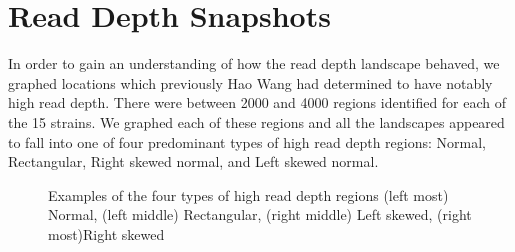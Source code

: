 \documentclass[12pt]{article}
\begin{document}
\section{Read Depth Snapshots}
\vspace{-0.5cm}
	In order to gain an understanding of how the read depth landscape behaved, we graphed locations which previously Hao Wang had determined to have notably high read depth. There were between 2000 and 4000 regions identified for each of the 15 strains. We graphed each of these regions and all the landscapes appeared to fall into one of four predominant types of high read depth regions: Normal, Rectangular, Right skewed normal, and Left skewed normal.
\begin{figure}[H]
	\begin{centering}
		\begin{singlespace}
			\vspace{-0.5cm}
			\caption[Examples of the four types of high read depth regions.]{Examples of the four types of high read depth regions (left most) Normal, (left middle) Rectangular, (right middle) Left skewed, (right most)Right skewed}\label{four_rds}
		\end{singlespace}
	\end{centering}
\end{figure}

%
%
\vspace{-0.5cm}
\end{document}
